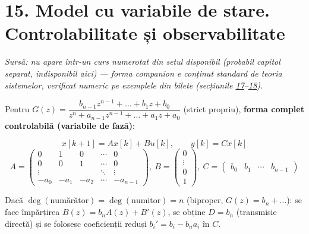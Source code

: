 \documentclass[10pt,a4paper]{article}
\newcommand{\srcnote}[1]{{\footnotesize\color{gray!55!black}\textit{Sursă: #1}}\par}
\begin{document}
\begin{center}
\end{center}

\section*{15. Model cu variabile de stare. Controlabilitate și observabilitate}\label{sec:15}
\srcnote{nu apare într-un curs numerotat din setul disponibil (probabil capitol separat, indisponibil aici) — forma companion e conținut standard de teoria sistemelor, verificat numeric pe exemplele din bilete (secțiunile \hyperref[sec:17]{17}–\hyperref[sec:18]{18}).}
Pentru $G(z)=\dfrac{b_{n-1}z^{n-1}+\dots+b_1z+b_0}{z^n+a_{n-1}z^{n-1}+\dots+a_1z+a_0}$ (strict propriu), \textbf{forma complet controlabilă (variabile de fază)}:
\begin{keyeq}\color{red!65!black}
$$x[k+1]=Ax[k]+Bu[k],\qquad y[k]=Cx[k]$$
$$A=\begin{pmatrix}0&1&0&\cdots&0\\0&0&1&\cdots&0\\\vdots&&&\ddots&\vdots\\-a_0&-a_1&-a_2&\cdots&-a_{n-1}\end{pmatrix},\ B=\begin{pmatrix}0\\\vdots\\0\\1\end{pmatrix},\ C=\begin{pmatrix}b_0&b_1&\cdots&b_{n-1}\end{pmatrix}$$
\end{keyeq}
Dacă $\deg(\text{numărător})=\deg(\text{numitor})=n$ (biproper, $G(z)=b_n+\dots$): se face împărțirea $B(z)=b_nA(z)+B'(z)$, se obține $D=b_n$ (transmisie directă) și se folosesc coeficienții reduși $b_i'=b_i-b_na_i$ în $C$.
\end{document}
